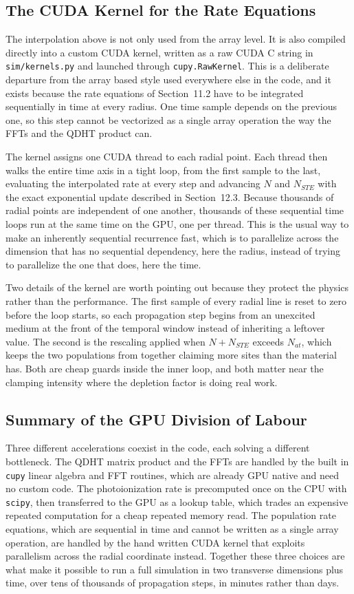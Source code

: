\subsection{The CUDA Kernel for the Rate Equations}

The interpolation above is not only used from the array level. It is also compiled directly into a custom CUDA kernel, written as a raw CUDA C string in \texttt{sim/kernels.py} and launched through \texttt{cupy.RawKernel}. This is a deliberate departure from the array based style used everywhere else in the code, and it exists because the rate equations of Section~11.2 have to be integrated sequentially in time at every radius. One time sample depends on the previous one, so this step cannot be vectorized as a single array operation the way the FFTs and the QDHT product can.

The kernel assigns one CUDA thread to each radial point. Each thread then walks the entire time axis in a tight loop, from the first sample to the last, evaluating the interpolated rate at every step and advancing $N$ and $N_{STE}$ with the exact exponential update described in Section~12.3. Because thousands of radial points are independent of one another, thousands of these sequential time loops run at the same time on the GPU, one per thread. This is the usual way to make an inherently sequential recurrence fast, which is to parallelize across the dimension that has no sequential dependency, here the radius, instead of trying to parallelize the one that does, here the time.

Two details of the kernel are worth pointing out because they protect the physics rather than the performance. The first sample of every radial line is reset to zero before the loop starts, so each propagation step begins from an unexcited medium at the front of the temporal window instead of inheriting a leftover value. The second is the rescaling applied when $N+N_{STE}$ exceeds $N_{at}$, which keeps the two populations from together claiming more sites than the material has. Both are cheap guards inside the inner loop, and both matter near the clamping intensity where the depletion factor is doing real work.

\subsection{Summary of the GPU Division of Labour}

Three different accelerations coexist in the code, each solving a different bottleneck. The QDHT matrix product and the FFTs are handled by the built in \texttt{cupy} linear algebra and FFT routines, which are already GPU native and need no custom code. The photoionization rate is precomputed once on the CPU with \texttt{scipy}, then transferred to the GPU as a lookup table, which trades an expensive repeated computation for a cheap repeated memory read. The population rate equations, which are sequential in time and cannot be written as a single array operation, are handled by the hand written CUDA kernel that exploits parallelism across the radial coordinate instead. Together these three choices are what make it possible to run a full simulation in two transverse dimensions plus time, over tens of thousands of propagation steps, in minutes rather than days.
